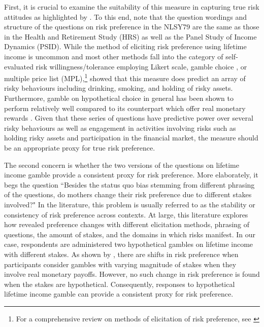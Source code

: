 \documentclass[emulatestandardclasses, 10pt, abstract = true]{scrartcl}
\begin{document}
First, it is crucial to examine the suitability of this measure in capturing true risk attitudes as highlighted by \citet{yilmazer2015portfolio}. To this end, note that the question wordings and structure of the questions on risk preference in the NLSY79 are the same as those in the Health and Retirement Study (HRS) as well as the Panel Study of Income Dynamics (PSID). While the method of eliciting risk preference using lifetime income is uncommon and most other methods fall into the category of self-evaluated risk willingness/tolerance employing Likert scale, gamble choice \citep{eckel2002sex}, or multiple price list (MPL),\footnote{For a comprehensive review on methods of elicitation of risk preference, see \citet{charness2013experimental}} \citet{barsky1997preference} showed that this measure does predict an array of risky behaviours including drinking, smoking, and holding of risky assets. Furthermore, gamble on hypothetical choice in general has been shown to perform relatively well compared to its counterpart which offer real monetary rewards \citep{binswanger1981attitudes, camerer1999effects, dohmen2005individual}. Given that these series of questions have predictive power over several risky behaviours as well as engagement in activities involving risks such as holding risky assets and participation in the financial market, the measure should be an appropriate proxy for true risk preference. 

The second concern is whether the two versions of the questions on lifetime income gamble provide a consistent proxy for risk preference. More elaborately, it begs the question ``Besides the status quo bias stemming from different phrasing of the questions, do mothers change their risk preference due to different stakes involved?" In the literature, this problem is usually referred to as the stability or consistency of risk preference across contexts. At large, this literature explores how revealed preference changes with different elicitation methods, phrasing of questions, the amount of stakes, and the domains in which risks manifest. In our case, respondents are administered two hypothetical gambles on lifetime income with different stakes. As shown by \citet{holt2002risk}, there are shifts in risk preference when participants consider gambles with varying magnitude of stakes when they involve real monetary payoffs. However, no such change in risk preference is found when the stakes are hypothetical. Consequently, responses to hypothetical lifetime income gamble can provide a consistent proxy for risk preference.
\end{document}
